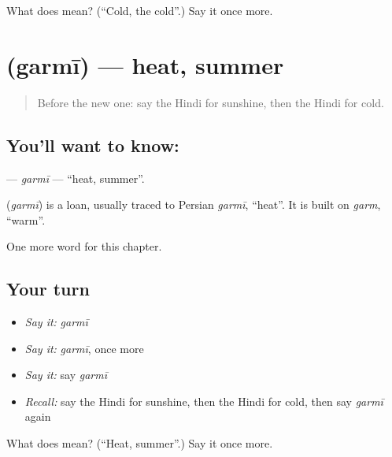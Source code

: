 \begin{tcolorbox}[breakable,colback=teal!4,colframe=teal!35!black,title={Before you move on}]
What does  mean? (\textquotedblleft{}Cold, the cold\textquotedblright{}.) Say it once more.
\end{tcolorbox}
\section[\texorpdfstring{\hi{गर्मी} (garmī)}{गर्मी (garmī)}]{ (garmī) — heat, summer}

\label{lesson:HI-C185-garmi}



\begin{quote}
Before the new one: say the Hindi for sunshine, then the Hindi for cold.
\end{quote}

\subsection*{You'll want to know: }
\textbf{} — \emph{garmī} — \textquotedblleft{}heat, summer\textquotedblright{}.

\begin{cousinweb}
\textbf{} (\emph{garmī}) is a loan, usually traced to Persian \emph{garmī}, \textquotedblleft{}heat\textquotedblright{}. It is built on \emph{garm}, \textquotedblleft{}warm\textquotedblright{}.
\end{cousinweb}

\begin{grammarlens}[title={What you've built}]
One more word for this chapter.
\end{grammarlens}

\subsection*{Your turn}
\begin{itemize}
\raggedright
  \item \emph{Say it:} \emph{garmī}
  \item \emph{Say it:} \emph{garmī}, once more
  \item \emph{Say it:} say \emph{garmī}
  \item \emph{Recall:} say the Hindi for sunshine, then the Hindi for cold, then say \emph{garmī} again
\end{itemize}

\begin{tcolorbox}[breakable,colback=teal!4,colframe=teal!35!black,title={Before you move on}]
What does  mean? (\textquotedblleft{}Heat, summer\textquotedblright{}.) Say it once more.
\end{tcolorbox}
